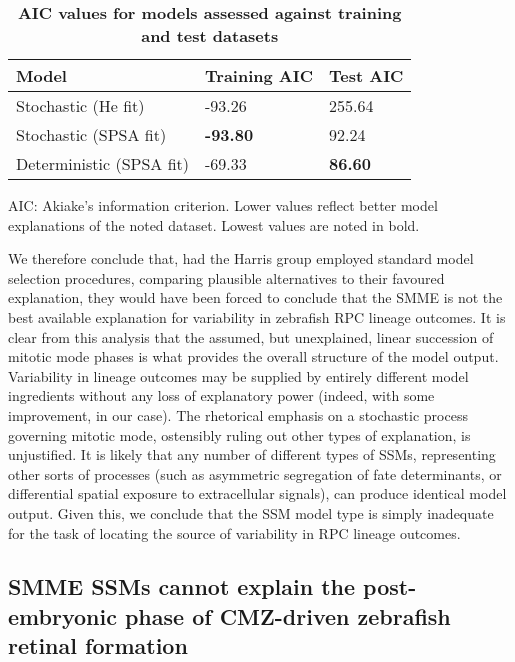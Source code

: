\begin{table}[!ht]
\centering
\caption{
{\bf AIC values for models assessed against training and test datasets}}
\begin{tabular}{|l|l|l|}
\hline
{\bf Model} & {\bf Training AIC} & {\bf Test AIC} \\ \hline
Stochastic (He fit) & -93.26 & 255.64\\ \hline
Stochastic (SPSA fit) & {\bf -93.80} & 92.24\\ \hline
Deterministic (SPSA fit) & -69.33 & {\bf 86.60}\\ \hline
\end{tabular}
\begin{flushleft} AIC: Akiake's information criterion. Lower values reflect better model explanations of the noted dataset. Lowest values are noted in bold.
\end{flushleft}
\label{AICtable}
\end{table}

We therefore conclude that, had the Harris group employed standard model selection procedures, comparing plausible alternatives to their favoured explanation, they would have been forced to conclude that the SMME is not the best available explanation for variability in zebrafish RPC lineage outcomes. It is clear from this analysis that the assumed, but unexplained, linear succession of mitotic mode phases is what provides the overall structure of the model output. Variability in lineage outcomes may be supplied by entirely different model ingredients without any loss of explanatory power (indeed, with some improvement, in our case). The rhetorical emphasis on a stochastic process governing mitotic mode, ostensibly ruling out other types of explanation, is unjustified. It is likely that any number of different types of SSMs, representing other sorts of processes (such as asymmetric segregation of fate determinants, or differential spatial exposure to extracellular signals), can produce identical model output. Given this, we conclude that the SSM model type is simply inadequate for the task of locating the source of variability in RPC lineage outcomes.

\subsection{SMME SSMs cannot explain the post-embryonic phase of CMZ-driven zebrafish retinal formation}

